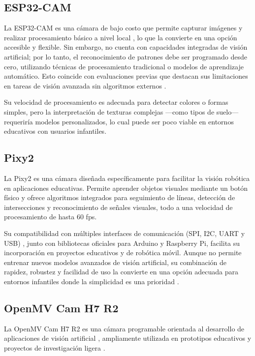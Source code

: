 \documentclass{prgrado}
\begin{document}
\subsection{ESP32-CAM}

La ESP32-CAM es una cámara de bajo costo que permite capturar imágenes y realizar procesamiento básico a nivel local \cite{espressif2025esp32datasheet}, lo que la convierte en una opción accesible y flexible. Sin embargo, no cuenta con capacidades integradas de visión artificial; por lo tanto, el reconocimiento de patrones debe ser programado desde cero, utilizando técnicas de procesamiento tradicional o modelos de aprendizaje automático. Esto coincide con evaluaciones previas que destacan sus limitaciones en tareas de visión avanzada sin algoritmos externos \cite{espressif2025esp32datasheet}.

Su velocidad de procesamiento es adecuada para detectar colores o formas simples, pero la interpretación de texturas complejas —como tipos de suelo— requeriría modelos personalizados, lo cual puede ser poco viable en entornos educativos con usuarios infantiles.

\subsection{Pixy2}

La Pixy2 es una cámara diseñada específicamente para facilitar la visión robótica en aplicaciones educativas. Permite aprender objetos visuales mediante un botón físico y ofrece algoritmos integrados para seguimiento de líneas, detección de intersecciones y reconocimiento de señales visuales, todo a una velocidad de procesamiento de hasta 60 fps.

Su compatibilidad con múltiples interfaces de comunicación (SPI, I2C, UART y USB) \cite{pixycamNDsensor,pixycamNDline}, junto con bibliotecas oficiales para Arduino y Raspberry Pi, facilita su incorporación en proyectos educativos y de robótica móvil. Aunque no permite entrenar nuevos modelos avanzados de visión artificial, su combinación de rapidez, robustez y facilidad de uso la convierte en una opción adecuada para entornos infantiles donde la simplicidad es una prioridad \cite{pixycam2024cmucam5}.

\subsection{OpenMV Cam H7 R2}

La OpenMV Cam H7 R2 es una cámara programable orientada al desarrollo de aplicaciones de visión artificial \cite{openmvNDDocs,openmvNDh7quickref}, ampliamente utilizada en prototipos educativos y proyectos de investigación ligera \cite{openmv2022h7}.
\end{document}

